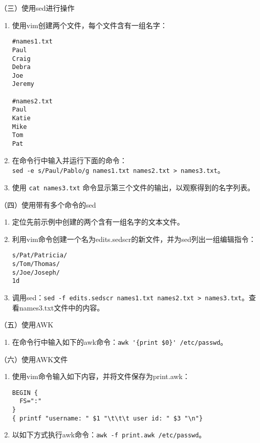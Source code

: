 \vspace{0.1in}
（三）使用sed进行操作
\begin{enumerate}
  \item 使用vim创建两个文件，每个文件含有一组名字：
\begin{verbatim}
#names1.txt
Paul
Craig
Debra
Joe
Jeremy

#names2.txt
Paul
Katie
Mike
Tom
Pat
\end{verbatim}
  \item 在命令行中输入并运行下面的命令：\\ \verb|sed -e s/Paul/Pablo/g names1.txt names2.txt > names3.txt|。
  \item 使用 \verb|cat names3.txt| 命令显示第三个文件的输出，以观察得到的名字列表。
\end{enumerate}

\vspace{0.1in}
（四）使用带有多个命令的sed
\begin{enumerate}
  \item 定位先前示例中创建的两个含有一组名字的文本文件。
  \item 利用vim命令创建一个名为edits.sedscr的新文件，并为sed列出一组编辑指令：
\begin{verbatim}
s/Pat/Patricia/
s/Tom/Thomas/
s/Joe/Joseph/
1d
\end{verbatim}
  \item 调用sed：\verb|sed -f edits.sedscr names1.txt names2.txt > names3.txt|。查看names3.txt文件中的内容。
\end{enumerate}

\vspace{0.1in}
（五）使用AWK
\begin{enumerate}
  \item 在命令行中输入如下的awk命令：\verb|awk '{print $0}' /etc/passwd|。
\end{enumerate}

\vspace{0.1in}
（六）使用AWK文件
\begin{enumerate}
  \item 使用vim命令输入如下内容，并将文件保存为print.awk：
\begin{verbatim}
BEGIN {
  FS=":"
}
{ printf "username: " $1 "\t\t\t user id: " $3 "\n"}
\end{verbatim}
  \item 以如下方式执行awk命令：\verb|awk -f print.awk /etc/passwd|。
\end{enumerate}

